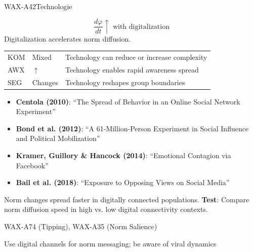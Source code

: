 \begin{axiomspec}{WAX-A42}{Technologie}

\begin{equation}
\frac{d\varphi}{dt} \uparrow \text{ with digitalization}
\end{equation}
Digitalization accelerates norm diffusion.

\begin{tabular}{lll}
KOM & Mixed & Technology can reduce or increase complexity \\
AWX & $\uparrow$ & Technology enables rapid awareness spread \\
SEG & Changes & Technology reshapes group boundaries \\
\end{tabular}

\begin{itemize}
\item \textbf{Centola (2010)}: ``The Spread of Behavior in an Online Social Network Experiment''
\item \textbf{Bond et al. (2012)}: ``A 61-Million-Person Experiment in Social Influence and Political Mobilization''
\item \textbf{Kramer, Guillory \& Hancock (2014)}: ``Emotional Contagion via Facebook''
\item \textbf{Bail et al. (2018)}: ``Exposure to Opposing Views on Social Media''
\end{itemize}

Norm changes spread faster in digitally connected populations.
\textbf{Test}: Compare norm diffusion speed in high vs. low digital connectivity contexts.

WAX-A74 (Tipping), WAX-A35 (Norm Salience)

Use digital channels for norm messaging; be aware of viral dynamics

\end{axiomspec}


